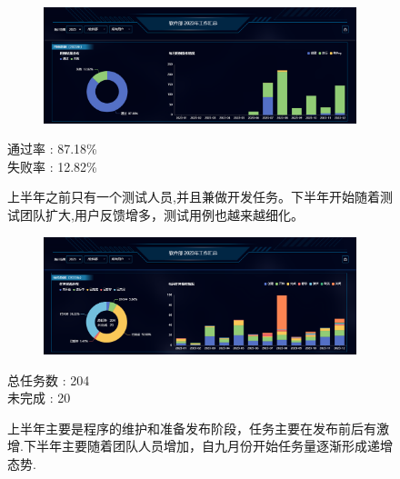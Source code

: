 \documentclass[AutoFakeBold,AutoFakeSlant]{beamer}
\begin{document}
	\begin{frame}[fragile]
		\begin{figure}
			\centering %
			\begin{subfigure}{\linewidth}
				\includegraphics[width=\linewidth]{Case}
			\end{subfigure}
			
			\begin{minipage}[l]{0.3\linewidth}
				\large
				通过率 : 87.18\% \\
				失败率 : 12.82\%
			\end{minipage}\hfill
			\begin{minipage}[l]{0.6\linewidth}
			\footnotesize
			\linespread{1.6} \selectfont
			上半年之前只有一个测试人员,并且兼做开发任务。下半年开始随着测试团队扩大,用户反馈增多，测试用例也越来越细化。
			\end{minipage}
		\end{figure} 
	\end{frame}
	
	\begin{frame}[fragile]
		\begin{figure}
			\centering %
			\begin{subfigure}{\linewidth}
				\includegraphics[width=\linewidth]{Task}
			\end{subfigure} 
			
			\begin{minipage}[l]{0.3\linewidth}
				\large
				总任务数 : 204 \\
				未完成  : 20
			\end{minipage}\hfill
			\begin{minipage}[l]{0.6\linewidth}
				\footnotesize
				\linespread{1.6} \selectfont
				上半年主要是程序的维护和准备发布阶段，任务主要在发布前后有激增.下半年主要随着团队人员增加，自九月份开始任务量逐渐形成递增态势.
			\end{minipage}
		\end{figure}
	\end{frame}
	
\end{document}
